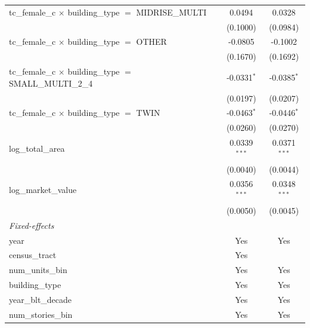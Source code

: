 \begin{tabular}{lcc}
   tc\_female\_c $\times$ building\_type $=$ MIDRISE\_MULTI            & 0.0494         & 0.0328\\   
                                                                       & (0.1000)       & (0.0984)\\   
   tc\_female\_c $\times$ building\_type $=$ OTHER                     & -0.0805        & -0.1002\\   
                                                                       & (0.1670)       & (0.1692)\\   
   tc\_female\_c $\times$ building\_type $=$ SMALL\_MULTI\_2\_4        & -0.0331$^{*}$  & -0.0385$^{*}$\\   
                                                                       & (0.0197)       & (0.0207)\\   
   tc\_female\_c $\times$ building\_type $=$ TWIN                      & -0.0463$^{*}$  & -0.0446$^{*}$\\   
                                                                       & (0.0260)       & (0.0270)\\   
   log\_total\_area                                                    & 0.0339$^{***}$ & 0.0371$^{***}$\\   
                                                                       & (0.0040)       & (0.0044)\\   
   log\_market\_value                                                  & 0.0356$^{***}$ & 0.0348$^{***}$\\   
                                                                       & (0.0050)       & (0.0045)\\   
   \midrule
   \emph{Fixed-effects}\\
   year                                                                & Yes            & Yes\\  
   census\_tract                                                       & Yes            & \\  
   num\_units\_bin                                                     & Yes            & Yes\\  
   building\_type                                                      & Yes            & Yes\\  
   year\_blt\_decade                                                   & Yes            & Yes\\  
   num\_stories\_bin                                                   & Yes            & Yes\\  

\end{tabular}
